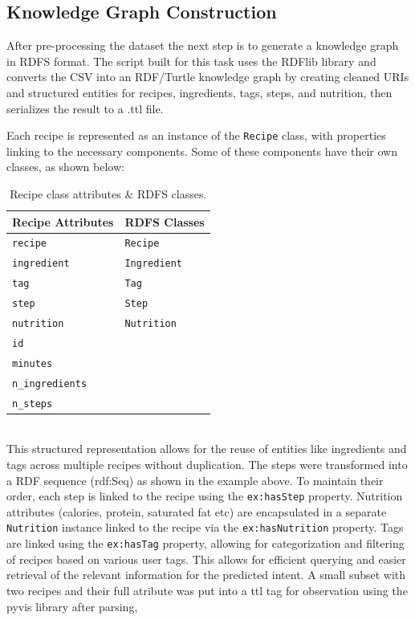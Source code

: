 \documentclass{article}
\begin{document}
\subsection{Knowledge Graph Construction}
\noindent
After pre-processing the dataset the next step is to generate a knowledge graph in RDFS format. The script built for this task uses the RDFlib library \cite{rdflib_docs} and converts the CSV into an RDF/Turtle knowledge graph by creating cleaned URIs and structured entities for recipes, ingredients, tags, steps, and nutrition, then serializes the result to a .ttl file.


\noindent
Each recipe is represented as an instance of the \texttt{Recipe} class, with properties linking to the necessary components. Some of these components have their own classes, as shown below: \\









\begin{table}[H]
\centering
\scriptsize
\caption{Recipe class attributes \& RDFS classes.}
\label{tab:rdf-classes}
\begin{tabularx}{\columnwidth}{@{} l @{\hspace{10em}} Y @{}}
\toprule
\textbf{Recipe Attributes} & \textbf{RDFS Classes} \\
\midrule
\texttt{recipe} &  \texttt{Recipe} \\
\texttt{ingredient} & \texttt{Ingredient} \\
\texttt{tag} & \texttt{Tag} \\
\texttt{step} & \texttt{Step} \\
\texttt{nutrition} & \texttt{Nutrition} \\
\texttt{id} & \\
\texttt{minutes} & \\
\texttt{n\_ingredients} & \\
\texttt{n\_steps} & \\

\bottomrule
\end{tabularx}
\end{table}




\noindent
\\
This structured representation allows for the reuse of entities like ingredients and tags across multiple recipes without duplication. The steps were transformed into a RDF sequence (rdf:Seq) as shown in the example above. To maintain their order, each step is linked to the recipe using the \texttt{ex:hasStep} property. Nutrition attributes (calories, protein, saturated fat etc) are encapsulated in a separate \texttt{Nutrition} instance linked to the recipe via the \texttt{ex:hasNutrition} property. Tags are linked using the \texttt{ex:hasTag} property, allowing for categorization and filtering of recipes based on various user tags.
This allows for efficient querying and easier retrieval of the relevant information for the predicted intent. A small subset with two recipes and their full atribute was put into a ttl tag for observation using the pyvis \cite{pyvis_docs} library after parsing,
\end{document}
